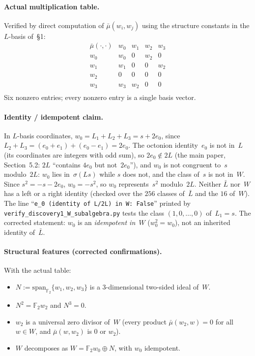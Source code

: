 \documentclass[11pt]{amsart}
\newcommand{\FF}{\mathbb{F}}
\begin{document}
\paragraph{Actual multiplication table.}
Verified by direct computation of $\bar\mu(w_i, w_j)$ using the
structure constants in the $L$-basis of~\S1:
\[
\begin{array}{c|cccc}
\bar\mu(\cdot,\cdot) & w_0 & w_1 & w_2 & w_3 \\ \hline
w_0 & w_0 & 0   & w_2 & 0   \\
w_1 & w_1 & 0   & 0   & w_2 \\
w_2 & 0   & 0   & 0   & 0   \\
w_3 & w_3 & w_2 & 0   & 0   \\
\end{array}
\]
Six nonzero entries; every nonzero entry is a single basis vector.

\paragraph{Identity / idempotent claim.}
In $L$-basis coordinates, $w_0 = L_1 + L_2 + L_3 = s + 2e_0$, since
$L_2 + L_3 = (e_0 + e_1) + (e_0 - e_1) = 2 e_0$. The octonion
identity~$e_0$ is not in~$L$ (its coordinates are integers with odd sum), so $2e_0 \notin 2L$ (the main paper, Section~5.2: $2L$
``contains $4e_0$ but not~$2e_0$''), and $w_0$ is not congruent to~$s$
modulo~$2L$: $w_0$ lies in~$\sigma(Ls)$ while $s$ does not, and the class
of~$s$ is not in~$W$. Since $s^2 = -s - 2e_0$, $w_0 = -s^2$, so $w_0$
represents~$s^2$ modulo~$2L$. Neither $\bar L$ nor~$W$ has a left or a
right identity (checked over the $256$ classes of~$\bar L$ and the $16$
of~$W$). The line ``\texttt{e\_0 (identity of L/2L) in W: False}''
printed by \texttt{verify\_discovery1\_W\_subalgebra.py} tests the class
$(1, 0, \ldots, 0)$ of~$L_1 = s$. The corrected statement: $w_0$ is an
\emph{idempotent in~$W$} ($w_0^2 = w_0$), not an inherited identity
of~$\bar L$.

\paragraph{Structural features (corrected confirmations).}
With the actual table:
\begin{itemize}
\item $N := \mathrm{span}_{\FF_2}\{w_1, w_2, w_3\}$ is a $3$-dimensional
  two-sided ideal of~$W$.
\item $N^2 = \FF_2 w_2$ and $N^3 = 0$.
\item $w_2$ is a universal zero divisor of~$W$ (every product
  $\bar\mu(w_2, w) = 0$ for all $w \in W$, and $\bar\mu(w, w_2)$ is
  $0$ or $w_2$).
\item $W$ decomposes as $W = \FF_2 w_0 \oplus N$, with $w_0$
  idempotent.
\end{itemize}
\end{document}

